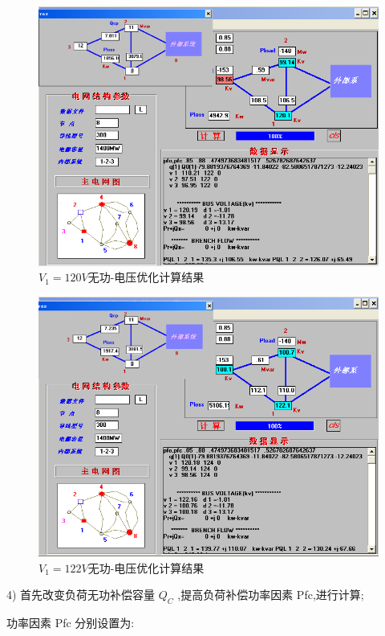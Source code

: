 \documentclass[a4paper]{ctexrep}
\begin{document}
                    \begin{figure}[htbp]
                        \centering
                        \includegraphics[width=12cm]{24.png} 
                        \caption{$V_1=120V$无功-电压优化计算结果}
                    \end{figure}

                    \begin{figure}[htbp]
                        \centering
                        \includegraphics[width=12cm]{25.png} 
                        \caption{$V_1=122V$无功-电压优化计算结果}
                    \end{figure}
                    
                    4) 首先改变负荷无功补偿容量 $Q_C$ ,提高负荷补偿功率因素 Pfc,进行计算;

                    功率因素 Pfc 分别设置为:
\end{document}
